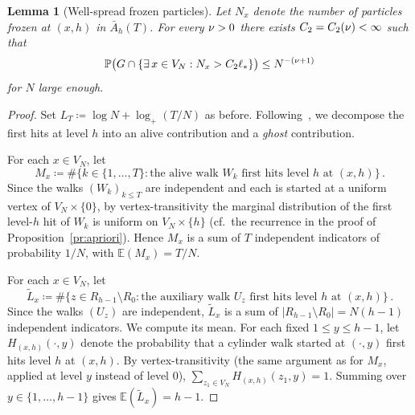 \documentclass[11pt,a4paper,reqno]{amsart}
\newtheorem{Lemma}[Theorem]{Lemma}
\theoremstyle{definition}
\newcommand{\bbE}{{\ensuremath{\mathbb E}} }
\newcommand{\bbP}{{\ensuremath{\mathbb P}} }
\begin{document}
\begin{Lemma}[Well-spread frozen particles]\label{le:wellspread}
Let $N_x$ denote the number of particles frozen at $(x, h)$ in $\bar A_h(T)$. For every $\nu > 0$ there exists $C_2 = C_2(\nu) < \infty$ such that
	\[ \bbP\big( G \cap \{ \exists\, x \in V_N : N_x > C_2 \ell_* \} \big) \leq N^{-(\n+1)} \]
for $N$ large enough.
\end{Lemma}

\begin{proof}
Set $L_T \coloneqq \log N + \log_+(T/N)$ as before. Following~\cite{lawler1992internal}, we decompose the first hits at level $h$ into an alive contribution and a \emph{ghost} contribution.

For each $x \in V_N$, let
	\[ M_x \coloneqq \#\big\{ k \in \{1, \ldots, T\} : \text{the alive walk } W_k \text{ first hits level } h \text{ at } (x, h) \big\}\,. \]
Since the walks $(W_k)_{k\leq T}$ are independent and each is started at a uniform vertex of $V_N \times \{0\}$, by vertex-transitivity the marginal distribution of the first level-$h$ hit of $W_k$ is uniform on $V_N \times \{h\}$ (cf.\ the recurrence in the proof of Proposition~\ref{pr:apriori}). Hence $M_x$ is a sum of $T$ independent indicators of probability $1/N$, with $\bbE(M_x) = T/N$.

For each $x \in V_N$, let
	\[ \widetilde L_x \coloneqq \#\big\{ z \in R_{h-1} \setminus R_0 : \text{the auxiliary walk } U_z \text{ first hits level } h \text{ at } (x,h) \big\}\,. \]
Since the walks $(U_z)$ are independent, $\widetilde L_x$ is a sum of $|R_{h-1}\setminus R_0| = N(h-1)$ independent indicators. We compute its mean. For each fixed $1 \leq y \leq h-1$, let $H_{(x,h)}(\cdot, y)$ denote the probability that a cylinder walk started at $(\cdot, y)$ first hits level $h$ at $(x, h)$. By vertex-transitivity (the same argument as for $M_x$, applied at level $y$ instead of level $0$), $\sum_{z_1 \in V_N} H_{(x,h)}(z_1, y) = 1$. Summing over $y \in \{1, \ldots, h-1\}$ gives $\bbE(\widetilde L_x) = h - 1$.


\end{proof}
\end{document}
